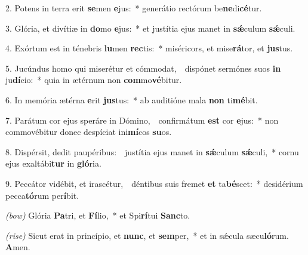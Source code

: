 2. Potens in terra erit \textbf{se}men \textbf{e}jus:~*
	generátio rectórum be\textbf{ne}di\textbf{cé}tur.

3. Glória, et divítiæ in \textbf{do}mo \textbf{e}jus:~*
	et justítia ejus manet in \textbf{s\'{\ae}}culum \textbf{s\'{\ae}}culi.

4. Exórtum est in ténebris \textbf{lu}men \textbf{rec}tis:~*
	miséricors, et mise\textbf{rá}tor, et \textbf{jus}tus.

5. Jucúndus homo qui miserétur et cómmodat,~{\color{red}\GreDagger}\
	dispónet sermónes suos \textbf{in} ju\textbf{dí}cio:~*
	quia in ætérnum non \textbf{com}mo\textbf{vé}bitur.

6. In memória ætérna \textbf{e}rit \textbf{jus}tus:~*
	ab auditióne mala \textbf{non} ti\textbf{mé}bit.

7. Parátum cor ejus speráre in Dómino,~{\color{red}\GreDagger}\
	confirmátum \textbf{est} cor \textbf{e}jus:~*
	non commovébitur donec despíciat ini\textbf{mí}cos \textbf{su}os.

8. Dispérsit, dedit paupéribus:~{\color{red}\GreDagger}\
	justítia ejus manet in \textbf{s\'{\ae}}culum \textbf{s\'{\ae}}\-culi,~*
	cornu ejus exaltábi\textbf{tur} in \textbf{gló}ria.

9. Peccátor vidébit, et irascétur,~{\color{red}\GreDagger}\
	déntibus suis fremet \textbf{et} ta\textbf{bé}scet:~*
	desidérium pecca\textbf{tó}rum per\textbf{í}bit.

{\color{red}\textit{(bow)}} Glória \textbf{Pa}tri, et \textbf{Fí}lio,~*
	et Spi\textbf{rí}tui \textbf{Sanc}to.

{\color{red}\textit{(rise)}} Sicut erat in princípio, et \textbf{nunc}, et \textbf{sem}per,~*
	et in s\'{\ae}cula sæcu\textbf{ló}rum. \textbf{A}men.
